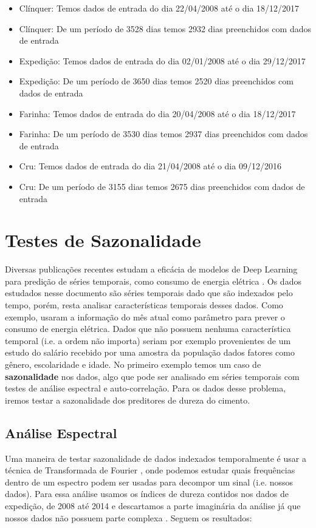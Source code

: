 \begin{itemize}
\item Clínquer: Temos dados de entrada do dia 22/04/2008 até o dia 18/12/2017
\item Clínquer: De um período de 3528 dias temos 2932 dias preenchidos com dados de entrada
\item Expedição: Temos dados de entrada do dia 02/01/2008 até o dia 29/12/2017
\item Expedição: De um período de 3650 dias temos 2520 dias preenchidos com dados de entrada
\item Farinha: Temos dados de entrada do dia 20/04/2008 até o dia 18/12/2017
\item Farinha: De um período de 3530 dias temos 2937 dias preenchidos com dados de entrada
\item Cru: Temos dados de entrada do dia 21/04/2008 até o dia 09/12/2016
\item Cru: De um período de 3155 dias temos 2675 dias preenchidos com dados de entrada
\end{itemize}


\section{Testes de Sazonalidade}

Diversas publicações recentes estudam a eficácia de modelos de Deep Learning
para predição de séries temporais, como consumo de energia elétrica
\citep{lstmbr}. Os dados estudados nesse documento são séries temporais dado que
são indexados pelo tempo, porém, resta analisar características temporais desses
dados. Como exemplo, \cite{lstmbr} usaram a informação do mês atual como
parâmetro para prever o consumo de energia elétrica. Dados que não possuem nenhuma característica temporal (i.e. a ordem não importa) seriam por exemplo provenientes de um estudo do salário recebido por uma amostra da população dados fatores como gênero, escolaridade e idade. No primeiro exemplo temos um caso de \textbf{sazonalidade} nos dados, algo que pode ser analisado em séries temporais com testes de análise espectral e auto-correlação. Para os dados desse problema, iremos testar a sazonalidade dos preditores de dureza do cimento.

\subsection{Análise Espectral}

Uma maneira de testar sazonalidade de dados indexados temporalmente é usar a
técnica de Transformada de Fourier \citep{spec}, onde podemos estudar quais
frequências dentro de um espectro podem ser usadas para decompor um sinal (i.e.
nossos dados). Para essa análise usamos os índices de dureza contidos nos dados
de expedição, de 2008 até 2014 e descartamos a parte imaginária da análise já
que nossos dados não possuem parte complexa \citep{spec}. Seguem os resultados:


